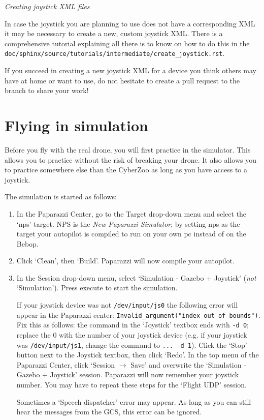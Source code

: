 \textit{Creating joystick XML files}

In case the joystick you are planning to use does not have a corresponding XML it may be necessary to create a new, custom joystick XML. There is a comprehensive tutorial explaining all there is to know on how to do this in the \texttt{doc/sphinx/source/tutorials/intermediate/create\_joystick.rst}.

If you succeed in creating a new joystick XML for a device you think others may have at home or want to use, do not hesitate to create a pull request to the \coursebranch{} branch to share your work!

\section{Flying in simulation}
Before you fly with the real drone, you will first practice in the simulator.
This allows you to practice without the risk of breaking your drone. It also allows you to practice somewhere else than the CyberZoo as long as you have access to a joystick.

\medskip

The simulation is started as follows:
\begin{enumerate}
	\item In the Paparazzi Center, go to the Target drop-down menu and select the `nps' target. NPS is the \emph{New Paparazzi Simulator}; by setting nps as the target your autopilot is compiled to run on your own pc instead of on the Bebop.
	\item Click `Clean', then `Build'. Paparazzi will now compile your autopilot.
	\item In the Session drop-down menu, select `Simulation - Gazebo + Joystick' (\emph{not} `Simulation'). Press execute to start the simulation.
	
	If your joystick device was not \verb"/dev/input/js0" the following error will appear in the Paparazzi center: \verb|Invalid_argument("index out of bounds")|. Fix this as follows: the command in the `Joystick' textbox ends with \verb"-d 0"; replace the 0 with the number of your joystick device (e.g. if your joystick was \verb"/dev/input/js1", change the command to \verb"... -d 1"). Click the `Stop' button next to the Joystick textbox, then click `Redo'. In the top menu of the Paparazzi Center, click `Session $\rightarrow$ Save' and overwrite the `Simulation - Gazebo + Joystick' session. Paparazzi will now remember your joystick number. You may have to repeat these steps for the `Flight UDP' session.
	
	Sometimes a `Speech dispatcher' error may appear. As long as you can still hear the messages from the GCS, this error can be ignored.
\end{enumerate}

